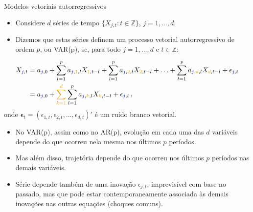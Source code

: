\documentclass[11pt]{beamer}
\begin{document}
\begin{frame}{Modelos vetoriais autorregressivos}
	\begin{itemize}
		\item Considere $d$ séries de tempo $\{X_{j,t}: t \in \mathbb{Z}\}$, $j=1,\ldots, d$.
		\item Dizemos que estas séries definem um processo vetorial autorregressivo de ordem $p$, ou VAR(p), se, para todo $j=1,\ldots, d$ e $t\in \mathbb{Z}$:
	\end{itemize}
	\begin{equation*}
		\begin{aligned}
			X_{{\color{blue}j},t} &= a_{{\color{blue}j},0}  +\sum_{l=1}^p a_{{\color{blue}j},{\color{orange}1},l} X_{{\color{orange}1},t-l} + \sum_{l=1}^p a_{{\color{blue}j},{\color{orange}2},l} X_{{\color{orange}2},t-l}   +\ldots + \sum_{l=1}^p a_{{\color{blue}j},{\color{orange}d},l} X_{{\color{orange}d},t-l}  + \epsilon_{{\color{blue}j},t} \\
			&= a_{{\color{blue}j},0}  +{\color{orange}\sum_{k=1}^{d}}\sum_{l=1}^p a_{{\color{blue}j},{\color{orange}k},l} X_{{\color{orange}k},t-l} + \epsilon_{{\color{blue}j},t} \, ,
		\end{aligned}
	\end{equation*}
	onde $\boldsymbol{\epsilon}_t = (\epsilon_{1,t},\epsilon_{2,t},\ldots, \epsilon_{d,t})'$ é um ruído branco vetorial.
	\begin{itemize}
		\item No VAR(p), assim como no AR(p), evolução em cada uma das $d$ variáveis depende do que ocorreu nela mesma nos últimos $p$ períodos.
		\item Mas além disso, trajetória depende do que ocorreu nos últimos $p$ períodos {\color{orange}nas demais variáveis}.
		\item Série depende também de uma inovação $\epsilon_{j,t}$, imprevisível com base no passado, mas que pode estar contemporaneamente associada às demais inovações nas outras equações (choques comuns).
	\end{itemize}
\end{frame}
\end{document}
